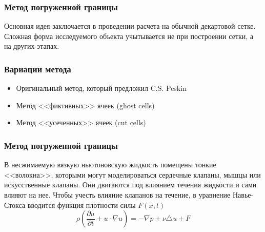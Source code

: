 \documentclass[14pt, notes]{beamer}
\begin{document}
\begin{frame}
\frametitle{Метод погруженной границы}
Основная идея заключается в проведении расчета на обычной декартовой сетке. Сложная форма исследуемого объекта учытывается не при построении сетки, а на других этапах.
\end{frame}

\begin{frame}
\frametitle{Вариации метода}
\begin{itemize}
    \item \alert<+>{Оригинальный метод, который предложил C.S. Peskin}
    \item \alert<+>{Метод <<фиктивных>> ячеек (ghost cells)}
    \item \alert<+>{Метод <<усеченных>> ячеек (cut cells)}
\end{itemize}
\end{frame}

\begin{frame}
\frametitle{Метод погруженной границы}
В несжимаемую вязкую ньютоновскую жидкость помещены тонкие <<волокна>>, которыми могут моделироваться сердечные клапаны, мышцы или искусственные клапаны. Они двигаются под влиянием течения жидкости и сами влияют на нее.
Чтобы учесть влияние клапанов на течение, в уравнение Навье-Стокса вводится функция плотности силы $F(x, t)$
\begin{equation}
    \rho (\frac{\partial u}{\partial t} + u \cdot \nabla u) = - \nabla p + \nu \triangle u + F
\end{equation}
\end{frame}
\end{document}
